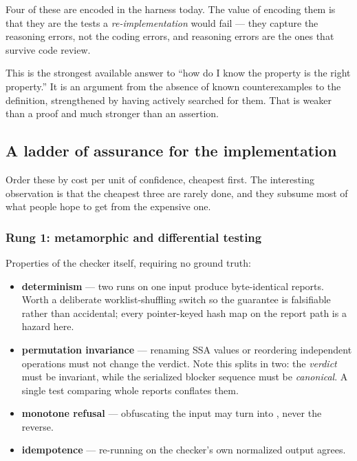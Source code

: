 Four of these are encoded in the harness today. The value of encoding them is
that they are the tests a \emph{re-implementation} would fail --- they capture the
reasoning errors, not the coding errors, and reasoning errors are the ones that
survive code review.

\begin{remark}
This is the strongest available answer to ``how do I know the property is the
right property.'' It is an argument from the absence of known counterexamples to
the definition, strengthened by having actively searched for them. That is
weaker than a proof and much stronger than an assertion.
\end{remark}

\subsection{A ladder of assurance for the implementation}

Order these by cost per unit of confidence, cheapest first. The interesting
observation is that the cheapest three are rarely done, and they subsume most of
what people hope to get from the expensive one.

\subsubsection*{Rung 1: metamorphic and differential testing}

Properties of the checker itself, requiring no ground truth:

\begin{itemize}[nosep,leftmargin=1.4em]
\item \textbf{determinism} --- two runs on one input produce byte-identical
      reports. Worth a deliberate worklist-shuffling switch so the guarantee is
      falsifiable rather than accidental; every pointer-keyed hash map on the
      report path is a hazard here.
\item \textbf{permutation invariance} --- renaming SSA values or reordering
      independent operations must not change the verdict. Note this splits in
      two: the \emph{verdict} must be invariant, while the serialized blocker
      sequence must be \emph{canonical}. A single test comparing whole reports
      conflates them.
\item \textbf{monotone refusal} --- obfuscating the input may turn \Verified{}
      into \Unknown{}, never the reverse.
\item \textbf{idempotence} --- re-running on the checker's own normalized output
      agrees.
\end{itemize}

